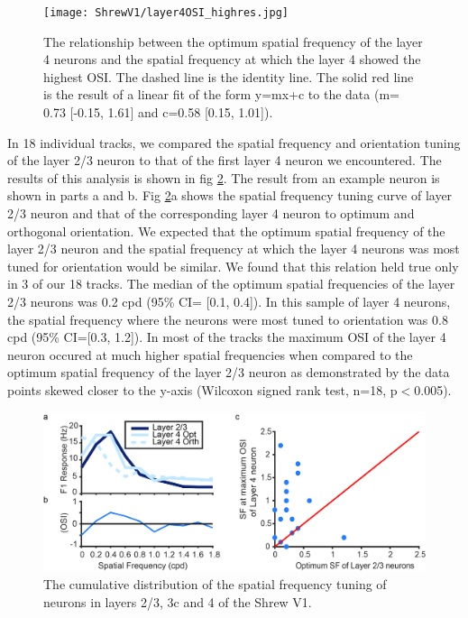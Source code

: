 \begin{figure}[H]
	
	\texttt{[image: ShrewV1/layer4OSI\_highres.jpg]}
	\caption{The relationship between the optimum spatial frequency of the layer 4 neurons and the spatial frequency at which the layer 4 showed the highest OSI. The dashed line is the identity line. The solid red line is the result of a linear fit of the form y=mx+c to the data (m= 0.73 [-0.15, 1.61] and c=0.58 [0.15, 1.01]). }
	\label{fig:OSI4}
\end{figure}

In 18 individual tracks, we compared the spatial frequency and orientation tuning of the layer 2/3 neuron to that of the first layer 4 neuron we encountered. The results of this analysis is shown in fig \ref{fig:sfsum}. The result from an example neuron is shown in parts a and b. Fig \ref{fig:sfsum}a shows the spatial frequency tuning curve of layer 2/3 neuron and that of the corresponding layer 4 neuron to optimum and orthogonal orientation. We expected that the optimum spatial frequency of the layer 2/3 neuron and the spatial frequency at which the layer 4 neurons was most tuned for orientation would be similar. We found that this relation held true only in 3 of our 18 tracks. The median of the optimum spatial frequencies of the layer 2/3 neurons was 0.2 cpd (95\% CI= [0.1, 0.4]). In this sample of layer 4 neurons, the spatial frequency where the neurons were most tuned to orientation was 0.8 cpd (95\% CI=[0.3, 1.2]). In most of the tracks the maximum OSI of the layer 4 neuron occured at much higher spatial frequencies when compared to the optimum spatial frequency of the layer 2/3 neuron as demonstrated by the data points skewed closer to the y-axis (Wilcoxon signed rank test, n=18, p$<$0.005).
	\begin{figure}[H]
	
		\includegraphics[width=\linewidth]{ShrewV1/sfsummary.jpg}
		\caption{The cumulative distribution of the spatial frequency tuning of neurons in layers 2/3, 3c and 4 of the Shrew V1.}
		\label{fig:sfsum}
	\end{figure}

